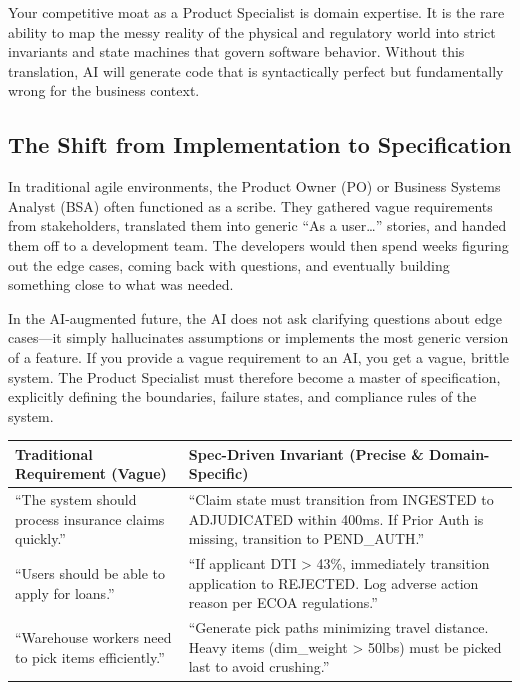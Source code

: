 Your competitive moat as a Product Specialist is domain expertise. It is
the rare ability to map the messy reality of the physical and regulatory
world into strict invariants and state machines that govern software
behavior. Without this translation, AI will generate code that is
syntactically perfect but fundamentally wrong for the business context.

\subsection{The Shift from Implementation to
Specification}\label{the-shift-from-implementation-to-specification}

In traditional agile environments, the Product Owner (PO) or Business
Systems Analyst (BSA) often functioned as a scribe. They gathered vague
requirements from stakeholders, translated them into generic ``As a
user\ldots{}'' stories, and handed them off to a development team. The
developers would then spend weeks figuring out the edge cases, coming
back with questions, and eventually building something close to what was
needed.

In the AI-augmented future, the AI does not ask clarifying questions
about edge cases---it simply hallucinates assumptions or implements the
most generic version of a feature. If you provide a vague requirement to
an AI, you get a vague, brittle system. The Product Specialist must
therefore become a master of specification, explicitly defining the
boundaries, failure states, and compliance rules of the system.

\begin{longtable}[]{@{}
  >{\raggedright\arraybackslash}p{}
  >{\raggedright\arraybackslash}p{}@{}}
\toprule\noalign{}
\begin{minipage}[b]{\linewidth}\raggedright
Traditional Requirement (Vague)
\end{minipage} & \begin{minipage}[b]{\linewidth}\raggedright
Spec-Driven Invariant (Precise \& Domain-Specific)
\end{minipage} \\
\midrule\noalign{}
\endhead
\bottomrule\noalign{}
\endlastfoot
``The system should process insurance claims quickly.'' & ``Claim state
must transition from INGESTED to ADJUDICATED within 400ms. If Prior Auth
is missing, transition to PEND\_AUTH.'' \\
``Users should be able to apply for loans.'' & ``If applicant DTI
\textgreater{} 43\%, immediately transition application to REJECTED. Log
adverse action reason per ECOA regulations.'' \\
``Warehouse workers need to pick items efficiently.'' & ``Generate pick
paths minimizing travel distance. Heavy items (dim\_weight
\textgreater{} 50lbs) must be picked last to avoid crushing.'' \\
\end{longtable}

